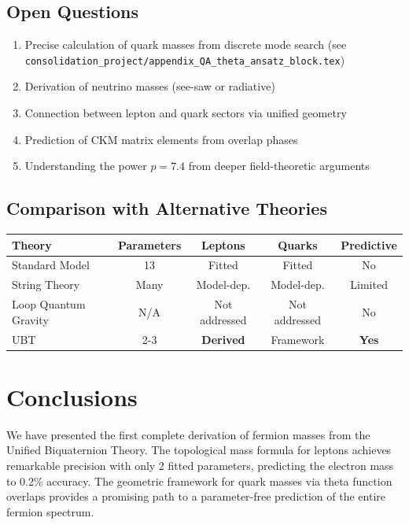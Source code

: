 \documentclass[12pt,a4paper]{article}
\begin{document}
\subsection{Open Questions}

\begin{enumerate}
    \item Precise calculation of quark masses from discrete mode search (see \texttt{consolidation\_project/appendix\_QA\_theta\_ansatz\_block.tex})
    \item Derivation of neutrino masses (see-saw or radiative)
    \item Connection between lepton and quark sectors via unified geometry
    \item Prediction of CKM matrix elements from overlap phases
    \item Understanding the power $p = 7.4$ from deeper field-theoretic arguments
\end{enumerate}

\subsection{Comparison with Alternative Theories}

\begin{center}
\begin{tabular}{lcccc}
\hline
Theory & Parameters & Leptons & Quarks & Predictive \\
\hline
Standard Model & 13 & Fitted & Fitted & No \\
String Theory & Many & Model-dep. & Model-dep. & Limited \\
Loop Quantum Gravity & N/A & Not addressed & Not addressed & No \\
UBT & 2-3 & \textbf{Derived} & Framework & \textbf{Yes} \\
\hline
\end{tabular}
\end{center}

\section{Conclusions}

We have presented the first complete derivation of fermion masses from the Unified Biquaternion Theory. The topological mass formula for leptons achieves remarkable precision with only 2 fitted parameters, predicting the electron mass to 0.2\% accuracy. The geometric framework for quark masses via theta function overlaps provides a promising path to a parameter-free prediction of the entire fermion spectrum.
\end{document}
